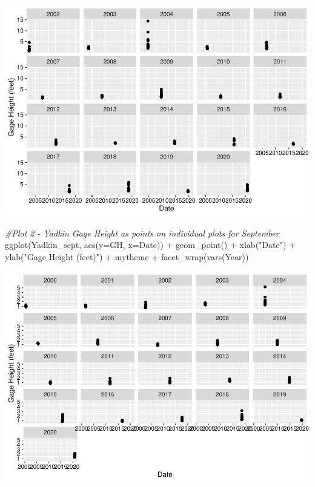 \documentclass[
  12pt,
]{article}
\newenvironment{Shaded}{\begin{snugshade}}{\end{snugshade}}
\newcommand{\AttributeTok}[1]{\textcolor[rgb]{0.77,0.63,0.00}{#1}}
\newcommand{\CommentTok}[1]{\textcolor[rgb]{0.56,0.35,0.01}{\textit{#1}}}
\newcommand{\FunctionTok}[1]{\textcolor[rgb]{0.00,0.00,0.00}{#1}}
\newcommand{\NormalTok}[1]{#1}
\newcommand{\SpecialCharTok}[1]{\textcolor[rgb]{0.00,0.00,0.00}{#1}}
\newcommand{\StringTok}[1]{\textcolor[rgb]{0.31,0.60,0.02}{#1}}
\begin{document}
\includegraphics{Project_Template_files/figure-latex/Plots-1.pdf}

\begin{Shaded}
\begin{Highlighting}[]
\CommentTok{\#Plot 2 {-} Yadkin Gage Height as points on individual plots for September}
\FunctionTok{ggplot}\NormalTok{(Yadkin\_sept, }\FunctionTok{aes}\NormalTok{(}\AttributeTok{y=}\NormalTok{GH, }\AttributeTok{x=}\NormalTok{Date)) }\SpecialCharTok{+}
  \FunctionTok{geom\_point}\NormalTok{() }\SpecialCharTok{+}
  \FunctionTok{xlab}\NormalTok{(}\StringTok{"Date"}\NormalTok{) }\SpecialCharTok{+}
  \FunctionTok{ylab}\NormalTok{(}\StringTok{"Gage Height (feet)"}\NormalTok{) }\SpecialCharTok{+}
\NormalTok{  mytheme }\SpecialCharTok{+}
  \FunctionTok{facet\_wrap}\NormalTok{(}\FunctionTok{vars}\NormalTok{(Year)) }
\end{Highlighting}
\end{Shaded}

\includegraphics{Project_Template_files/figure-latex/Plots-2.pdf}
\end{document}
